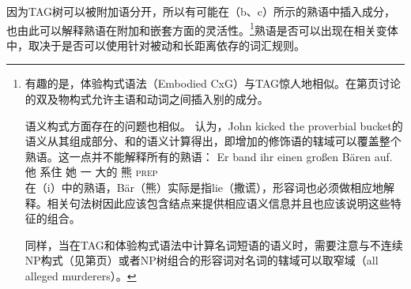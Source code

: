 因为TAG树可以被附加语分开，所以有可能在（b、c）所示的熟语中插入成分，也由此可以解释熟语在附加和嵌套方面的灵活性。\footnote{%
有趣的是，体验构式语法（Embodied CxG）与TAG惊人地相似。在第\pageref{CxG-Active-Ditransitive}页讨论的双及物构式允许主语和动词之间插入别的成分。

	语义构式方面存在的问题也相似。 \citet[]{AS89a}认为，John kicked the proverbial bucket的语义从其组成部分、和的语义计算得出，即增加的修饰语的辖域可以覆盖整个熟语。这一点并不能解释所有的熟语\citep{FK96a}：
\ea
\gll Er band ihr einen großen Bären auf.\\
	 他 系住 她 一 大的 熊 \textsc{prep}\\
\z
在（i）中的熟语，Bär（熊）实际是指lie（撒谎），形容词也必须做相应地解释。相关句法树因此应该包含结点来提供相应语义信息并且也应该说明这些特征的组合。

同样，当在TAG和体验构式语法中计算名词短语的语义时，需要注意与不连续NP构式（见第\pageref{CxG-DetNoun}页）或者NP树组合的形容词对名词的辖域可以取窄域（all alleged murderers）。
}熟语是否可以出现在相关变体中，取决于是否可以使用针对被动和长距离依存的词汇规则。
	

